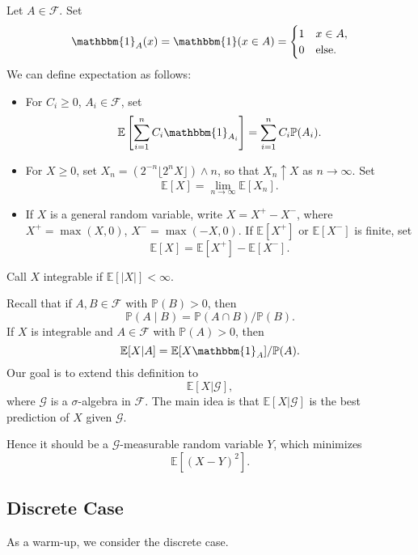 \documentclass[12pt]{article}
\begin{document}
Let $A \in \mathcal{F}$. Set
\[
\mathbbm{1}_{A}(x) = \mathbbm{1}(x \in A) = 
\begin{cases}
	1 & x \in A, \\
	0 & \text{else}.
\end{cases}
\]
We can define expectation as follows:
\begin{itemize}
	\item For $C_i \geq 0$, $A_i \in \mathcal{F}$, set
		\[
		\mathbb{E}\left[\sum_{i = 1}^n C_i \mathbbm{1}_{A_i} \right] = \sum_{i = 1}^n C_i \mathbb{P}(A_i).
		\]
	\item For $X \geq 0$, set $X_n = (2^{-n} \lfloor 2^n X \rfloor) \wedge n$, so that $X_n \uparrow X$ as $n \to \infty$. Set
		\[
		\mathbb{E}[X] = \lim_{n \to \infty} \mathbb{E}[X_n].
		\]
	\item If $X$ is a general random variable, write $X = X^+ - X^-$, where $X^+ = \max(X, 0)$, $X^- = \max(-X, 0)$. If $\mathbb{E}[X^+]$ or $\mathbb{E}[X^-]$ is finite, set
		\[
		\mathbb{E}[X] = \mathbb{E}[X^+] - \mathbb{E}[X^-].
		\]	
\end{itemize}
Call $X$ integrable if $\mathbb{E}[|X|] < \infty$.

Recall that if $A, B \in \mathcal{F}$ with $\mathbb{P}(B) > 0$, then
\[
\mathbb{P}(A \mid B) = \mathbb{P}(A \cap B)/\mathbb{P}(B).
\]
If $X$ is integrable and $A \in \mathcal{F}$ with $\mathbb{P}(A) > 0$, then
\[
\mathbb{E}[X | A] = \mathbb{E}[X \mathbbm{1}_{A}] / \mathbb{P}(A).
\]
Our goal is to extend this definition to
\[
\mathbb{E}[X | \mathcal{G}],
\]
where $\mathcal{G}$ is a $\sigma$-algebra in $\mathcal{F}$. The main idea is that $\mathbb{E}[X | \mathcal{G}]$ is the best prediction of $X$ given $\mathcal{G}$.

Hence it should be a $\mathcal{G}$-measurable random variable $Y$, which minimizes
\[
\mathbb{E}[(X - Y)^2].
\]


\subsection{Discrete Case}%
\label{sub:discrete_cond}


As a warm-up, we consider the discrete case.
\end{document}
